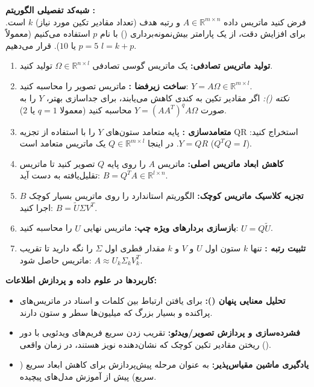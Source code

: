 \documentclass{article}
\begin{document}
\begin{enumerate}
    \vspace{0.3cm}
    \textbf{شبه‌کد تفصیلی الگوریتم :} \\
    فرض کنید ماتریس داده $A \in \mathbb{R}^{m \times n}$ و رتبه هدف (تعداد مقادیر تکین مورد نیاز) $k$ است. برای افزایش دقت، از یک پارامتر بیش‌نمونه‌برداری () با نام $p$ استفاده می‌کنیم (معمولاً $p=5$ یا $10$). قرار می‌دهیم $l = k + p$.

    \begin{enumerate}
        \item \textbf{تولید ماتریس تصادفی:} یک ماتریس گوسی تصادفی $\Omega \in \mathbb{R}^{n \times l}$ تولید کنید.
        \item \textbf{ساخت زیرفضا :} ماتریس تصویر را محاسبه کنید: $Y = A \Omega \in \mathbb{R}^{m \times l}$. \\
        \textit{نکته ():} اگر مقادیر تکین به کندی کاهش می‌یابند، برای جداسازی بهتر، $Y$ را به صورت $Y = (A A^T)^q A \Omega$ محاسبه کنید (معمولا $q=1$ یا $2$).
        \item \textbf{متعامدسازی :} پایه متعامد ستون‌های $Y$ را با استفاده از تجزیه QR استخراج کنید: $Y = Q R$. در اینجا $Q \in \mathbb{R}^{m \times l}$ یک ماتریس متعامد است ($Q^T Q = I$).
        \item \textbf{کاهش ابعاد ماتریس اصلی:} ماتریس $A$ را روی پایه $Q$ تصویر کنید تا ماتریس تقلیل‌یافته به دست آید: $B = Q^T A \in \mathbb{R}^{l \times n}$.
        \item \textbf{تجزیه کلاسیک ماتریس کوچک:} الگوریتم  استاندارد را روی ماتریس بسیار کوچک $B$ اجرا کنید: $B = \tilde{U} \Sigma V^T$.
        \item \textbf{بازسازی بردارهای ویژه چپ:} ماتریس نهایی $U$ را محاسبه کنید: $U = Q \tilde{U}$.
        \item \textbf{تثبیت رتبه :} تنها $k$ ستون اول $U$ و $V$ و $k$ مقدار قطری اول $\Sigma$ را نگه دارید تا تقریب ماتریس حاصل شود: $A \approx U_k \Sigma_k V_k^T$.
    \end{enumerate}

    \vspace{0.3cm}
    \textbf{کاربردها در علوم داده و پردازش اطلاعات:}
    \begin{itemize}
        \item \textbf{تحلیل معنایی پنهان ():} برای یافتن ارتباط بین کلمات و اسناد در ماتریس‌های پراکنده و بسیار بزرگ  که میلیون‌ها سطر و ستون دارند.
        \item \textbf{فشرده‌سازی و پردازش تصویر/ویدئو:} تقریب زدن سریع فریم‌های ویدئویی با دور ریختن مقادیر تکین کوچک که نشان‌دهنده نویز هستند، در زمان واقعی ().
        \item \textbf{یادگیری ماشین مقیاس‌پذیر:} به عنوان مرحله پیش‌پردازش برای کاهش ابعاد سریع ( سریع) پیش از آموزش مدل‌های پیچیده.
    \end{itemize}
\end{enumerate}
\end{document}

